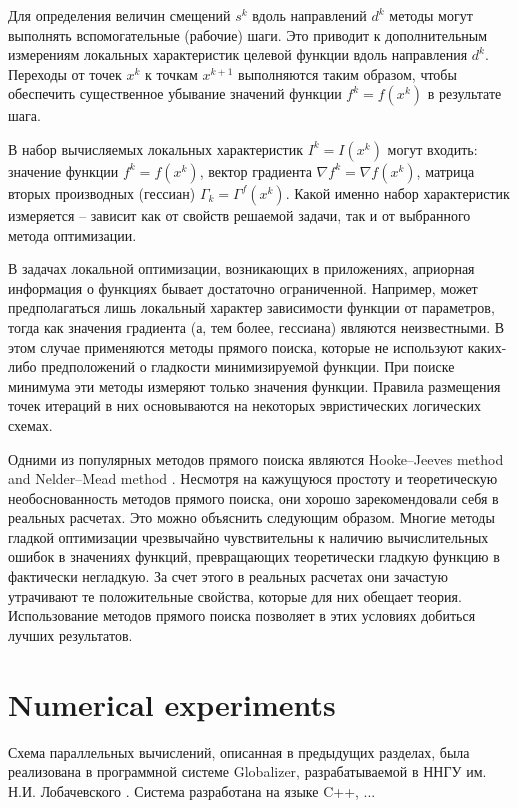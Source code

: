 \documentclass{svproc}
\begin{document}
Для определения величин смещений $s^k$ вдоль направлений $d^k$ методы могут выполнять вспомогательные (рабочие) шаги. Это приводит к дополнительным измерениям локальных характеристик целевой функции вдоль направления $d^k$. Переходы от точек $x^k$ к точкам $x^{k+1}$ выполняются таким образом, чтобы обеспечить существенное убывание значений функции $f^k = f( x^k )$ в результате шага.

В набор вычисляемых локальных характеристик $I^k=I(x^k)$ могут входить: значение функции $f^k = f( x^k )$, вектор градиента $\nabla f^k = \nabla f(x^k)$, матрица вторых производных (гессиан) $\Gamma_k=\Gamma^f(x^k)$. Какой именно набор характеристик измеряется -- зависит как от свойств решаемой задачи, так и от выбранного метода оптимизации.

В задачах локальной оптимизации, возникающих в приложениях, априорная информация о функциях бывает достаточно ограниченной. Например, может предполагаться лишь локальный характер зависимости функции от параметров, тогда как значения градиента (а, тем более, гессиана) являются неизвестными. В этом случае применяются методы прямого поиска, которые не используют каких-либо предположений о гладкости минимизируемой функции. При поиске минимума эти методы измеряют только значения функции. Правила размещения точек итераций в них основываются на некоторых эвристических логических схемах. 

Одними из популярных методов прямого поиска являются Hooke--Jeeves method \cite{HookJeeves} and Nelder--Mead method \cite{NelderMead}. Несмотря на кажущуюся простоту и теоретическую необоснованность методов прямого поиска, они хорошо зарекомендовали себя в реальных расчетах. Это можно объяснить следующим образом. Многие методы гладкой оптимизации чрезвычайно чувствительны к наличию вычислительных ошибок в значениях функций, превращающих теоретически гладкую функцию в фактически негладкую. За счет этого в реальных расчетах они зачастую утрачивают те положительные свойства, которые для них обещает теория. Использование методов прямого поиска позволяет в этих условиях добиться лучших результатов.

\section{Numerical experiments}

Схема параллельных вычислений, описанная в предыдущих разделах, была реализована в программной системе Globalizer, разрабатываемой в ННГУ им. Н.И. Лобачевского \cite{globalizerSystem,Sysoyev2017}. 
Система разработана на языке C++, ...
\end{document}
